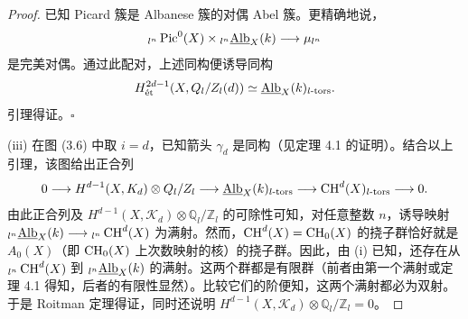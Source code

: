 \begin{proof}
已知 Picard 簇是 Albanese 簇的对偶 Abel 簇。更精确地说，
\[
{}_{l^n}\operatorname{Pic}^0(X)\times{}_{l^n}\underline{\operatorname{Alb}}_X(k)\longrightarrow\mu_{l^n}
\]
是完美对偶。通过此配对，上述同构便诱导同构
\[
H^{2d-1}_{\mathrm{\acute et}}(X,Q_l/Z_l(d))\simeq\underline{\operatorname{Alb}}_X(k)_{l\text{-}\mathrm{tors}}.
\]
引理得证。\hfill$\square$

(iii) 在图 (3.6) 中取 $i=d$，已知箭头 $\gamma_d$ 是同构（见定理 4.1 的证明）。结合以上引理，该图给出正合列
\[
0\longrightarrow H^{d-1}(X,K_d)\otimes Q_l/Z_l\longrightarrow\underline{\operatorname{Alb}}_X(k)_{l\text{-}\mathrm{tors}}\longrightarrow\operatorname{CH}^d(X)_{l\text{-}\mathrm{tors}}\longrightarrow0.
\]
由此正合列及 $H^{d-1}(X,\mathcal K_d)\otimes\mathbb Q_l/\mathbb Z_l$ 的可除性可知，对任意整数 $n$，诱导映射 ${}_{l^n}\underline{\operatorname{Alb}}_X(k)\longrightarrow{}_{l^n}\operatorname{CH}^d(X)$ 为满射。然而，$\operatorname{CH}^d(X)=\operatorname{CH}_0(X)$ 的挠子群恰好就是 $A_0(X)$（即 $\operatorname{CH}_0(X)$ 上次数映射的核）的挠子群。因此，由 (i) 已知，还存在从 ${}_{l^n}\operatorname{CH}^d(X)$ 到 ${}_{l^n}\underline{\operatorname{Alb}}_X(k)$ 的满射。这两个群都是有限群（前者由第一个满射或定理 4.1 得知，后者的有限性显然）。比较它们的阶便知，这两个满射都必为双射。于是 Roitman 定理得证，同时还说明 $H^{d-1}(X,\mathcal K_d)\otimes\mathbb Q_l/\mathbb Z_l=0$。
\end{proof}

